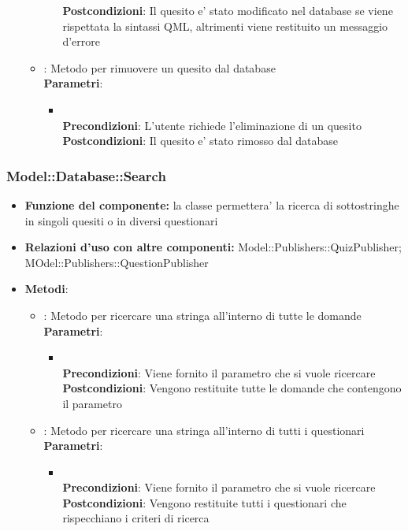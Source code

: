 \begin{itemize}
\begin{itemize}
\begin{itemize}
				\textbf{Postcondizioni}: Il quesito e' stato modificato nel database se viene rispettata la sintassi QML, altrimenti viene restituito un messaggio d'errore\\
			\end{itemize}
		\item{} : Metodo per rimuovere un quesito dal database\\
		\textbf{Parametri}:
			\begin{itemize}
				\item{}\\
				\textbf{Precondizioni}: L'utente richiede l'eliminazione di un quesito\\
				\textbf{Postcondizioni}: Il quesito e' stato rimosso dal database\\
			\end{itemize}
	\end{itemize}
\end{itemize}

\subsubsection{Model::Database::Search}
\begin{itemize}
\item\textbf{Funzione del componente:} la classe permettera' la ricerca di sottostringhe in singoli quesiti o in diversi questionari 
\item\textbf{Relazioni d'uso con altre componenti:} Model::Publishers::QuizPublisher; MOdel::Publishers::QuestionPublisher\\
\item\textbf{Metodi}:
\begin{itemize}
	\item{} : Metodo per ricercare una stringa all'interno di tutte le domande\\
	\textbf{Parametri}:
	\begin{itemize}
		\item{}\\
		\textbf{Precondizioni}: Viene fornito il parametro che si vuole ricercare\\
		\textbf{Postcondizioni}: Vengono restituite tutte le domande che contengono il parametro\\
	\end{itemize}
	\item{} :  Metodo per ricercare una stringa all'interno di tutti i questionari\\
	\textbf{Parametri}:
	\begin{itemize}
		\item{}\\
		\textbf{Precondizioni}: Viene fornito il parametro che si vuole ricercare\\
		\textbf{Postcondizioni}: Vengono restituite tutti i questionari che rispecchiano i criteri di ricerca\\
	\end{itemize}
\end{itemize}
\end{itemize}

